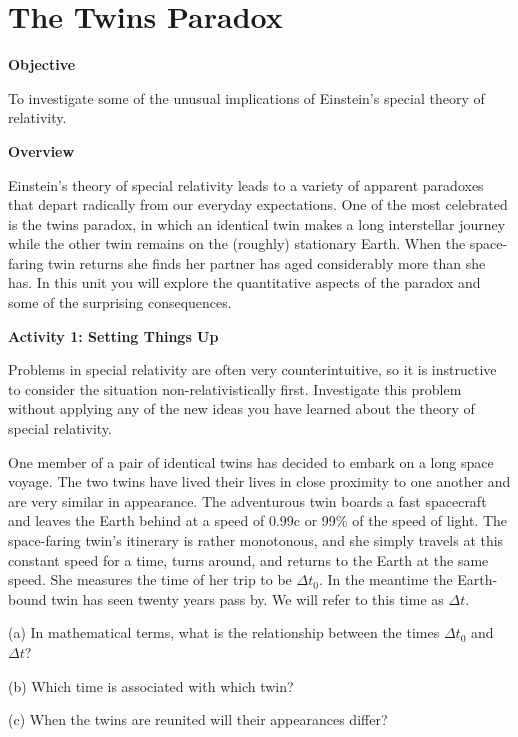 
\section{The Twins Paradox}

\makelabheader %

\textbf{Objective}

To investigate some of the unusual implications of Einstein's special
theory of relativity.

\textbf{Overview}

Einstein's theory of special relativity leads to a variety of apparent
paradoxes that depart radically from our everyday expectations. One
of the most celebrated is the twins paradox, in which an identical
twin makes a long interstellar journey while the other twin remains
on the (roughly) stationary Earth. When the space-faring twin returns
she finds her partner has aged considerably more than she has. In
this unit you will explore the quantitative aspects of the paradox
and some of the surprising consequences.

\textbf{Activity 1: Setting Things Up}

Problems in special relativity are often very counterintuitive, so
it is instructive to consider the situation non-relativistically first.
Investigate this problem without applying any of the new ideas you
have learned about the theory of special relativity.

One member of a pair of identical twins has decided to embark on a
long space voyage. The two twins have lived their lives in close proximity
to one another and are very similar in appearance. The adventurous
twin boards a fast spacecraft and leaves the Earth behind at a speed
of 0.99c or 99\% of the speed of light. The space-faring twin's itinerary
is rather monotonous, and she simply travels at this constant speed
for a time, turns around, and returns to the Earth at the same speed.
She measures the time of her trip to be \( \Delta  t_{0} \).
In the meantime the Earth-bound twin has seen twenty years pass by.
We will refer to this time as \( \Delta  t\).

(a) In mathematical terms, what is the relationship between the times
\( \Delta  t_{0} \) and \( \Delta t \)?
\answerspace{20mm}

(b) Which time is associated with which twin?
\answerspace{20mm}

(c) When the twins are reunited will their appearances differ?
\answerspace{20mm}

